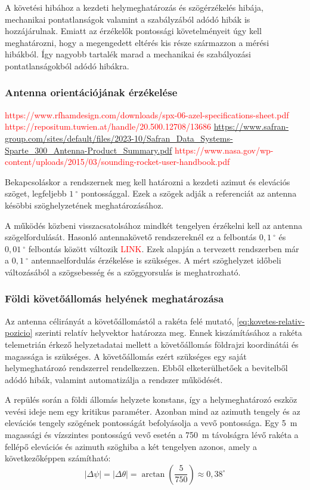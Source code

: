 A követési hibához a kezdeti helymeghatározás és szögérzékelés hibája, mechanikai
pontatlanságok valamint a szabályzából adódó hibák is hozzájárulnak. Emiatt az érzékelők
pontossági követelményeit úgy kell meghatározni, hogy a megengedett eltérés 
kis része származzon a mérési hibákból. Így nagyobb tartalék marad a mechanikai és
szabályozási pontatlanságokból adódó hibákra.


\subsubsection{Antenna orientációjának érzékelése}
\label{Req-Antenna-Orientacio}
\textcolor{red}{https://www.rfhamdesign.com/downloads/spx-06-azel-specifications-sheet.pdf}
\textcolor{red}{https://repositum.tuwien.at/handle/20.500.12708/13686}
\textcolor{red}{\url{https://www.safran-group.com/sites/default/files/2023-10/Safran_Data_Systems-Sparte_300_Antenna-Product_Summary.pdf}}
\textcolor{red}{https://www.nasa.gov/wp-content/uploads/2015/03/sounding-rocket-user-handbook.pdf}

Bekapcsoláskor a rendszernek meg kell határozni a kezdeti azimut és elevációs szöget,
legfeljebb $1~^\circ$ pontossággal.
Ezek a szögek adják a referenciát az antenna késöbbi szöghelyzetének meghatározásához.

A működés közbeni visszacsatolsához mindkét tengelyen érzékelni kell az antenna 
szögelfordulását. Hasonló antennakövető rendszereknél ez a felbontás
$0,1~^\circ$ és $0,01~^\circ$ felbontás között változik \textcolor{red}{LINK}. 
Ezek alapján a tervezett rendszerben már a $0,1~^\circ$ antennaelfordulás
érzékelése is szükséges. A mért szöghelyzet időbeli változásából
a szögsebesség és a szöggyorsulás is meghatrozható.

\subsubsection{Földi követőállomás helyének meghatározása}
Az antenna célirányát a követőállomástól a rakéta felé mutató,
\eqref{eq:kovetes-relativ-pozicio} szerinti relatív helyvektor
határozza meg. Ennek kiszámításához a rakéta telemetrián érkező
helyzetadatai mellett a követőállomás földrajzi koordinátái és
magassága is szükséges. A követőállomás ezért szükséges egy 
saját helymeghatározó rendszerrel rendelkezzen. Ebből
elketerülhetőek a bevitelből adódó hibák, valamint automatizálja
a rendszer működését.

A repülés során a földi állomás helyzete konstans, így a helymeghatározó eszköz
vevési ideje nem egy kritikus paraméter. Azonban mind az azimuth
tengely és az elevációs tengely szögének pontosságát befolyásolja a vevő pontossága. 
Egy 5~m magassági és vízszintes pontosságú  vevő esetén a 750~m távolságra lévő rakéta
a fellépő elevációs és azimuth szöghiba a két tengelyen azonos, amely 
a következőképpen számítható: 
\begin{equation}
    |\Delta\psi| = |\Delta\theta|
    = \arctan\!\left(\frac{5}{750}\right)
    \approx 0{,}38^\circ
\end{equation}

